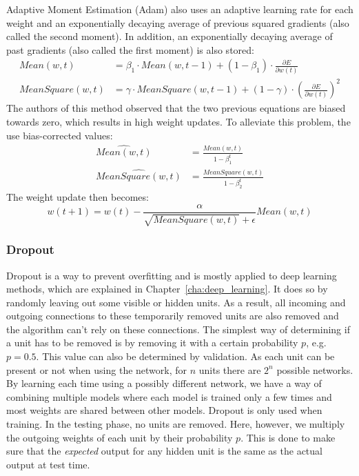 Adaptive Moment Estimation (Adam) \parencite{DBLP:journals/corr/KingmaB14} also uses an adaptive learning rate for each weight and an exponentially decaying average of previous squared gradients (also called the second moment). In addition, an exponentially decaying average of past gradients (also called the first moment) is also stored:
\begin{subequations}
\label{eq:adam:means}
\begin{align}
    Mean(w,t) &= \beta_1 \cdot Mean(w,t-1) + (1-\beta_1)\cdot \frac{\partial E}{\partial w(t)}\\
    MeanSquare(w, t) &= \gamma \cdot MeanSquare(w, t-1) + (1 - \gamma) \cdot \left (\frac{\partial E}{\partial w(t)} \right )^2
\end{align}
\end{subequations}
The authors of this method observed that the two previous equations are biased towards zero, which results in high weight updates. To alleviate this problem, the use bias-corrected values:
\begin{subequations}
\label{eq:adam:means:corrected}
\begin{align}
    \widehat{Mean(w,t)} &= \frac{Mean(w,t)}{1-\beta_1^t}\\
    \widehat{MeanSquare(w,t)} &= \frac{MeanSquare(w,t)}{1-\beta_2^t}
\end{align}
\end{subequations}
The weight update then becomes:
\begin{equation}
    w(t+1) = w(t) - \frac{\alpha}{\sqrt{MeanSquare(w,t)} + \epsilon} Mean(w,t)
\end{equation}

\subsubsection{Dropout} %
\label{ssub:dropout}
Dropout is a way to prevent overfitting and is mostly applied to deep learning methods, which are explained in Chapter~\ref{cha:deep_learning}. It does so by randomly leaving out some visible or hidden units. As a result, all incoming and outgoing connections to these temporarily removed units are also removed and the algorithm can't rely on these connections. The simplest way of determining if a unit has to be removed is by removing it with a certain probability $p$, e.g. $p=0.5$. This value can also be determined by validation. As each unit can be present or not when using the network, for $n$ units there are $2^n$ possible networks.
By learning each time using a possibly different network, we have a way of combining multiple models where each model is trained only a few times and most weights are shared between other models. Dropout is only used when training. In the testing phase, no units are removed. Here, however, we multiply the outgoing weights of each unit by their probability $p$.
This is done to make sure that the \textit{expected} output for any hidden unit is the same as the actual output at test time.



